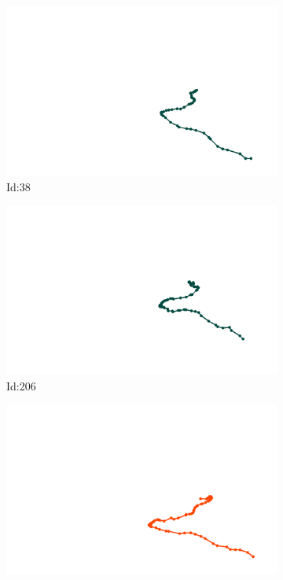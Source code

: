 \documentclass[12pt,twoside]{report}
\begin{document}
\begin{figure}
\centering
\begin{subfigure}[b]{0.20\textwidth}
\centering
\includegraphics[width=\textwidth]{../../trajectories/38.png}
\caption{Id:38}
\end{subfigure}
\begin{subfigure}[b]{0.20\textwidth}
\centering
\includegraphics[width=\textwidth]{../../trajectories/206.png}
\caption{Id:206}
\end{subfigure}
\begin{subfigure}[b]{0.20\textwidth}
\centering
\includegraphics[width=\textwidth]{../../trajectories/314.png}

\end{subfigure}
\end{figure}
\end{document}

